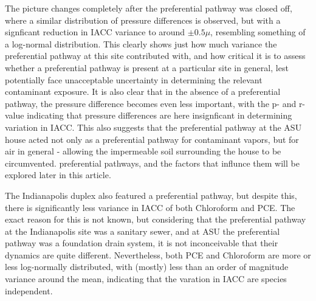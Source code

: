 \documentclass[journal=esthag,manuscript=article]{achemso}
\begin{document}
The picture changes completely after the preferential pathway was closed off, where a similar distribution of pressure differences is observed, but with a signficant reduction in IACC variance to around $\pm 0.5 \mu$, resembling something of a log-normal distribution.
This clearly shows just how much variance the preferential pathway at this site contributed with, and how critical it is to assess whether a preferential pathway is present at a particular site in general, lest potentially face unacceptable uncertainty in determining the relevant contaminant exposure.
It is also clear that in the absence of a preferential pathway, the pressure difference becomes even less important, with the p- and r-value indicating that pressure differences are here insignficant in determining variation in IACC.
This also suggests that the preferential pathway at the ASU house acted not only as a preferential pathway for contaminant vapors, but for air in general - allowing the impermeable soil surrounding the house to be circumvented.
preferential pathways, and the factors that influnce them will be explored later in this article.\par
The Indianapolis duplex also featured a preferential pathway, but despite this, there is significantly less variance in IACC of both Chloroform and PCE.
The exact reason for this is not known, but considering that the preferential pathway at the Indianapolis site was a sanitary sewer, and at ASU the preferential pathway was a foundation drain system, it is not inconceivable that their dynamics are quite different.
Nevertheless, both PCE and Chloroform are more or less log-normally distributed, with (mostly) less than an order of magnitude variance around the mean, indicating that the varation in IACC are species independent.\par
\end{document}
